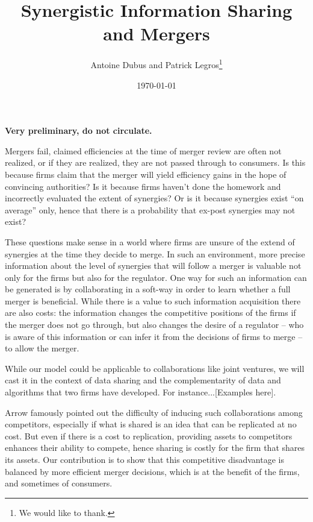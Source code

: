 \documentclass[a4paper,leqno]{article}%
\begin{document}
\title{Synergistic Information Sharing and Mergers}
\author{Antoine Dubus and Patrick Legros\thanks{We would like to thank.}}
\date{\today}


\maketitle

 
\textbf{Very preliminary, do not circulate.}

\baselineskip0.7cm
Mergers fail, claimed efficiencies at the time of merger review are often not realized, or if they are realized, they are not passed through to consumers. Is this because firms claim that the merger will yield efficiency gains in the hope of convincing authorities? Is it because firms haven't done the homework and incorrectly evaluated the extent of synergies? Or is it because synergies exist ``on average'' only, hence that there is a probability that ex-post synergies may not exist?

These questions make sense in a world where firms are unsure of the extend of synergies at the time they decide to merge. In such an environment, more precise information about the level of synergies that will follow a merger is valuable not only for the firms but also for the regulator. One way for such an information can be generated is by collaborating in a soft-way in order to learn whether a full merger is beneficial. While there is a value to such information acquisition there are also costs: the information changes the competitive positions of the firms if the merger does not go through, but also changes the desire of a regulator -- who is aware of this information or can infer it from the decisions of firms to merge -- to allow the merger.

While our model could be applicable to collaborations like  joint ventures, we will cast it in the context of data sharing and the complementarity of data and algorithms that two firms have developed.  For instance...[Examples here].

Arrow famously pointed out the difficulty of inducing such collaborations among competitors, especially if what is shared is an idea that can be replicated at no cost. But even if there is a cost to replication, providing assets to competitors enhances their ability to compete, hence sharing is costly for the firm that shares its assets. Our contribution is to show that this competitive disadvantage is balanced by more efficient merger decisions, which is at the benefit of the firms, and sometimes of consumers.
\end{document}
